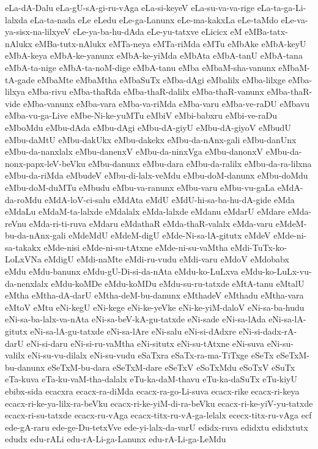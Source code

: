 {eLa-dA-Dalu
eLa-gU-sA-gi-ru-vAga
eLa-si-keyeV
eLa-su-va-va-rige
eLa-ta-ga-Li-lalxda
eLa-ta-nada
eLe
eLedu
eLe-ga-Lanunx
eLe-ma-kakxLa
eLe-taMdo
eLe-va-ya-sisx-na-lilxyeV
eLe-ya-ba-hu-dAda
eLe-yu-tatxve
eLicicx
eM
eMBa-tatx-nAlukx
eMBa-tutx-nAlukx
eMTa-neya
eMTa-riMda
eMTu
eMbAke
eMbA-keyU
eMbA-keya
eMbA-ke-yanunx
eMbA-ke-yiMda
eMbAta
eMbA-tanU
eMbA-tana
eMbA-ta-nige
eMbA-ta-noM-dige
eMbA-tanu
eMba
eMbaM-sha-vanunx
eMbaM-tA-gade
eMbaMte
eMbaMtha
eMbaSuTx
eMba-dAgi
eMbalilx
eMba-lilxge
eMba-lilxya
eMba-rivu
eMba-thaRda
eMba-thaR-dalilx
eMba-thaR-vanunx
eMba-thaR-vide
eMba-vanunx
eMba-vara
eMba-va-riMda
eMba-varu
eMba-ve-raDU
eMbavu
eMba-vu-ga-Live
eMbe-Ni-ke-yuMTu
eMbiV
eMbi-babxru
eMbi-ve-raDu
eMboMdu
eMbu-dAda
eMbu-dAgi
eMbu-dA-giyU
eMbu-dA-giyoV
eMbudU
eMbu-daMtU
eMbu-dakUkx
eMbu-dakekx
eMbu-da-nAnx-gali
eMbu-danUnx
eMbu-da-nanxlalx
eMbu-danenxV
eMbu-da-ninxVga
eMbu-danonxV
eMbu-da-nonx-papx-leV-beVku
eMbu-danunx
eMbu-dara
eMbu-da-ralilx
eMbu-da-ra-lilxna
eMbu-da-riMda
eMbudeV
eMbu-di-lalx-veMdu
eMbu-doM-danunx
eMbu-doMdu
eMbu-doM-duMTu
eMbudu
eMbu-va-ranunx
eMbu-varu
eMbu-vu-gaLa
eMdA-da-roMdu
eMdA-loV-ci-salu
eMdAta
eMdU
eMdU-hi-sa-ba-hu-dA-gide
eMda
eMdaLu
eMdaM-ta-lalxde
eMdalalx
eMda-lalxde
eMdanu
eMdarU
eMdare
eMda-reVnu
eMda-ri-ti-ruva
eMdaru
eMdathaR
eMda-thaR-valalx
eMda-varu
eMdeM-bu-da-nAnx-gali
eMdeMdU
eMdeM-digU
eMde-Ni-sa-lA-gitutx
eMdeV
eMde-ni-sa-takakx
eMde-nisi
eMde-ni-su-tAtxne
eMde-ni-su-vaMtha
eMdi-TuTx-ko-LoLxVNa
eMdigU
eMdi-naMte
eMdi-ru-vudu
eMdi-varu
eMdoV
eMdobabx
eMdu
eMdu-banunx
eMdu-gU-Di-si-da-nAta
eMdu-ko-LuLxva
eMdu-ko-LuLx-vu-da-nenxlalx
eMdu-koMDe
eMdu-koMDu
eMdu-su-ru-tatxde
eMtA-tanu
eMtalU
eMtha
eMtha-dA-darU
eMtha-deM-bu-danunx
eMthadeV
eMthadu
eMtha-vara
eMtoV
eMtu
eNi-kegU
eNi-kege
eNi-ke-yeVke
eNi-ke-yiM-daloV
eNi-sa-ba-hudu
eNi-sa-ba-lalx-va-nAta
eNi-sa-beV-kA-gu-tatxde
eNi-sade
eNi-sa-lAda
eNi-sa-lA-gitutx
eNi-sa-lA-gu-tatxde
eNi-sa-lAre
eNi-salu
eNi-si-dAdxre
eNi-si-dadx-rA-darU
eNi-si-daru
eNi-si-ru-vaMtha
eNi-situtx
eNi-su-tAtxne
eNi-suva
eNi-su-valilx
eNi-su-vu-dilalx
eNi-su-vudu
eSaTxra
eSaTx-ra-ma-TiTxge
eSeTx
eSeTxM-bu-danunx
eSeTxM-bu-dara
eSeTxM-dare
eSeTxV
eSoTxMdu
eSoTxV
eSuTx
eTa-kuva
eTa-ku-vaM-tha-dalalx
eTu-ka-daM-thavu
eTu-ka-daSuTx
eTu-kiyU
ebibx-sida
ecacxra
ecacx-ra-diMda
ecacx-ra-go-Li-suva
ecacx-rike
ecacx-ri-keya
ecacx-ri-ke-ya-lilx-ra-beVku
ecacx-ri-ke-yiM-di-ra-beVku
ecacx-ri-ke-yiV-yu-tatxde
ecacx-ri-su-tatxde
ecacx-ru-vAga
ecacx-titx-ru-vA-ga-lelalx
ececx-titx-ru-vAga
ecf
ede-gA-raru
ede-ge-Du-tetxVve
ede-yi-lalx-da-varU
edidx-ruva
edidxtu
edidxtutx
edudx
edu-rALi
edu-rA-Li-ga-Lanunx
edu-rA-Li-ga-LeMdu
}
